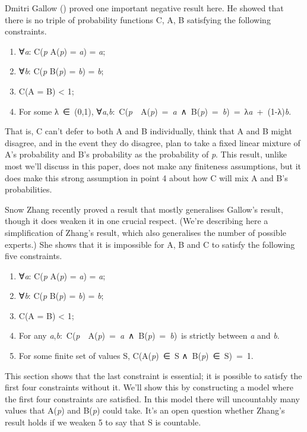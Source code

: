 \documentclass[
  10pt,
  letterpaper,
  DIV=11,
  numbers=noendperiod,
  twoside]{scrartcl}
\providecommand{\tightlist}{%
  \setlength{\itemsep}{0pt}\setlength{\parskip}{0pt}}\usepackage{longtable,booktabs,array}
\begin{document}
Dmitri Gallow () proved one important
negative result here. He showed that there is no triple of probability
functions C, A, B satisfying the following constraints.

\begin{enumerate}
\def\labelenumi{\arabic{enumi}.}
\tightlist
\item
  ∀\emph{a}: C(\emph{p} \textbar{} A(\emph{p}) = \emph{a}) = \emph{a};
\item
  ∀\emph{b}: C(\emph{p} \textbar{} B(\emph{p}) = \emph{b}) = \emph{b};
\item
  C(A = B) \textless{} 1;
\item
  For some λ~∈~(0,1),
  ∀\emph{a},\emph{b}:~C(\emph{p}~\textbar~A(\emph{p})~=~\emph{a}~∧~B(\emph{p})~=~\emph{b})~=~λ\emph{a}~+~(1-λ)\emph{b}.
\end{enumerate}

That is, C can't defer to both A and B individually, think that A and B
might disagree, and in the event they do disagree, plan to take a fixed
linear mixture of A's probability and B's probability as the probability
of \emph{p}. This result, unlike most we'll discuss in this paper, does
not make any finiteness assumptions, but it does make this strong
assumption in point 4 about how C will mix A and B's probabilities.

Snow Zhang recently proved a result that mostly generalises Gallow's
result, though it does weaken it in one crucial respect. (We're
describing here a simplification of Zhang's result, which also
generalises the number of possible experts.) She shows that it is
impossible for A, B and C to satisfy the following five constraints.

\begin{enumerate}
\def\labelenumi{\arabic{enumi}.}
\tightlist
\item
  ∀\emph{a}: C(\emph{p} \textbar{} A(\emph{p}) = \emph{a}) = \emph{a};
\item
  ∀\emph{b}: C(\emph{p} \textbar{} B(\emph{p}) = \emph{b}) = \emph{b};
\item
  C(A = B) \textless{} 1;
\item
  For any
  \emph{a},\emph{b}:~C(\emph{p}~\textbar~A(\emph{p})~=~\emph{a}~∧~B(\emph{p})~=~\emph{b})~is
  strictly between \emph{a} and \emph{b}.
\item
  For some finite set of values S, C(A(\emph{p})~∈~S
  ∧~B(\emph{p})~∈~S)~=~1.
\end{enumerate}

This section shows that the last constraint is essential; it is possible
to satisfy the first four constraints without it. We'll show this by
constructing a model where the first four constraints are satisfied. In
this model there will uncountably many values that A(\emph{p}) and
B(\emph{p}) could take. It's an open question whether Zhang's result
holds if we weaken 5 to say that S is countable.
\end{document}
